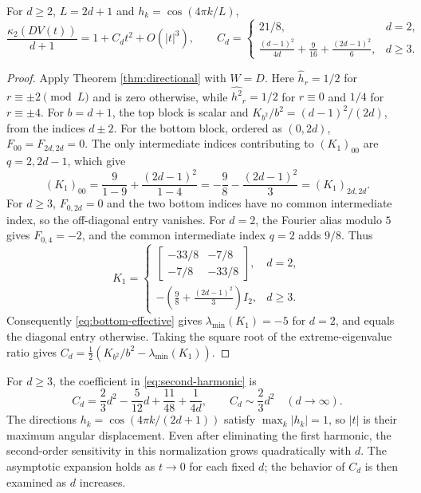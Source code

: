 \documentclass[10pt,twoside,final]{siamart1116}
\numberwithin{equation}{section}
\numberwithin{theorem}{section}
\newcommand{\cond}{\kappa_2}
\begin{document}
\begin{proposition}\label{prop:second-harmonic}
For $d\ge2$, $L=2d+1$ and $h_k=\cos(4\pi k/L)$,
\begin{equation}\label{eq:second-harmonic}
\frac{\cond(DV(t))}{d+1}=1+C_dt^2+O(|t|^3),\qquad
C_d=\begin{cases}
21/8,&d=2,\\
\displaystyle\frac{(d-1)^2}{4d}+\frac9{16}+\frac{(2d-1)^2}{6},&d\ge3.
\end{cases}
\end{equation}
\end{proposition}
\begin{proof}
Apply Theorem \ref{thm:directional} with $W=D$.
Here $\widehat h_r=1/2$ for $r\equiv\pm2\pmod L$ and is zero otherwise, while
$\widehat{h^2}_r=1/2$ for $r\equiv0$ and $1/4$ for $r\equiv\pm4$.
For $b=d+1$, the top block is scalar and
$K_{b^2}/b^2=(d-1)^2/(2d)$, from the indices $d\pm2$.
For the bottom block, ordered as $(0,2d)$, $F_{00}=F_{2d,2d}=0$.
The only intermediate indices contributing to $(K_1)_{00}$ are $q=2,2d-1$,
which give
\[
(K_1)_{00}=\frac{9}{1-9}+\frac{(2d-1)^2}{1-4}
=-\frac98-\frac{(2d-1)^2}{3}=(K_1)_{2d,2d}.
\]
For $d\ge3$, $F_{0,2d}=0$ and the two bottom indices have no common
intermediate index, so the off-diagonal entry vanishes. For $d=2$, the Fourier
alias modulo $5$ gives $F_{0,4}=-2$, and the common intermediate index $q=2$
adds $9/8$. Thus
\begin{equation}\label{eq:bottom-effective}
K_1=\begin{cases}
\begin{bmatrix}-33/8&-7/8\\-7/8&-33/8\end{bmatrix},&d=2,\\[6pt]
-\left(\displaystyle\frac98+\frac{(2d-1)^2}{3}\right)I_2,&d\ge3.
\end{cases}
\end{equation}
Consequently \eqref{eq:bottom-effective} gives $\lambda_{\min}(K_1)=-5$ for $d=2$, and equals the diagonal
entry otherwise. Taking the square root of the extreme-eigenvalue
ratio gives $C_d=\tfrac12(K_{b^2}/b^2-\lambda_{\min}(K_1))$.
\end{proof}

\begin{remark}\label{rem:dimension}
For $d\ge3$, the coefficient in \eqref{eq:second-harmonic} is
\begin{equation}\label{eq:dimension-coefficient}
C_d=\frac23d^2-\frac5{12}d+\frac{11}{48}+\frac1{4d},
\qquad C_d\sim\frac23d^2\quad(d\to\infty).
\end{equation}
The directions $h_k=\cos(4\pi k/(2d+1))$ satisfy $\max_k|h_k|=1$, so $|t|$
is their maximum angular displacement. Even after eliminating the first
harmonic, the second-order sensitivity in this normalization grows quadratically
with $d$. The asymptotic expansion holds as $t\to0$ for each fixed $d$; the behavior of $C_d$ is then examined as $d$ increases.
\end{remark}
\end{document}
